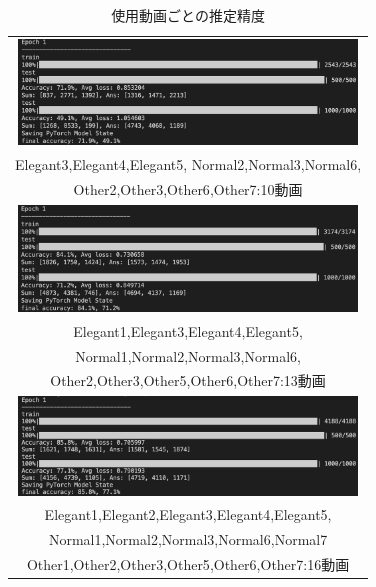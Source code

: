 \begin{table}[b]
  \begin{center}
    \begin{tabular}{c}
        \includegraphics[width=90mm]{images/net_result/result10.png}
      \\
        Elegant3\cite{ballet},Elegant4\cite{thai},Elegant5\cite{jpn2},
        Normal2\cite{kadokawa},Normal3\cite{bts},Normal6\cite{manolo},
      \\
        Other2\cite{posing},Other3\cite{boxing},Other6\cite{shinkokyu},Other7\cite{leaves}:10動画
      \\
        \includegraphics[width=90mm]{images/net_result/result13.png}
      \\
        Elegant1\cite{jpn},Elegant3\cite{ballet},Elegant4\cite{thai},Elegant5\cite{jpn2},
      \\
        Normal1\cite{ariana},Normal2\cite{kadokawa},Normal3\cite{bts},Normal6\cite{manolo},
      \\
        Other2\cite{posing},Other3\cite{boxing},Other5\cite{running},Other6\cite{shinkokyu},Other7\cite{leaves}:13動画
      \\
        \includegraphics[width=90mm]{images/net_result/result16.png}
      \\
        Elegant1\cite{jpn},Elegant2\cite{china},Elegant3\cite{ballet},Elegant4\cite{thai},Elegant5\cite{jpn2},
      \\
        Normal1\cite{ariana},Normal2\cite{kadokawa},Normal3\cite{bts},Normal6\cite{manolo},Normal7\cite{aito}
      \\
        Other1\cite{radio},Other2\cite{posing},Other3\cite{boxing},Other5\cite{running},Other6\cite{shinkokyu},Other7\cite{leaves}:16動画
      \\
    \end{tabular}
  \end{center}
  \caption{使用動画ごとの推定精度}
  \label{result}
\end{table}
\clearpage

